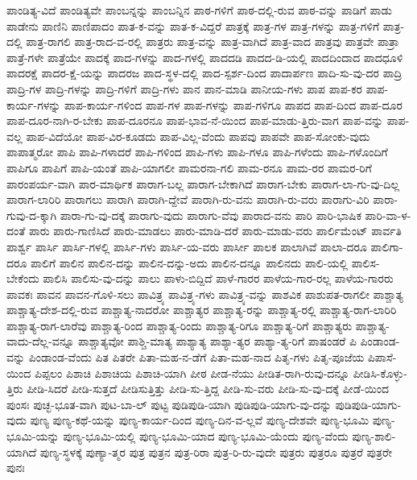 {ಪಾಂಡಿತ್ಯ-ವಿದೆ
ಪಾಂಡಿತ್ಯವೇ
ಪಾಂಬನ್ನನ್ನು
ಪಾಂಬನ್ನಿನ
ಪಾಠ-ಗಳಿಗೆ
ಪಾಠ-ದಲ್ಲಿ-ರುವ
ಪಾಠ-ವನ್ನು
ಪಾಡಿಗೆ
ಪಾಡು
ಪಾಡೇನು
ಪಾಣಿನಿ
ಪಾಣಿಪಾದಂ
ಪಾತ-ಕ-ವನ್ನು
ಪಾತ-ಕ-ವಿದ್ದರೆ
ಪಾತ್ರಕ್ಕೆ
ಪಾತ್ರ-ಗಳ
ಪಾತ್ರ-ಗಳನ್ನು
ಪಾತ್ರ-ಗಳಿಗೆ
ಪಾತ್ರ-ದಲ್ಲಿ
ಪಾತ್ರ-ರಾಗಲಿ
ಪಾತ್ರ-ರಾದ-ವ-ರಲ್ಲಿ
ಪಾತ್ರರು
ಪಾತ್ರ-ವನ್ನು
ಪಾತ್ರ-ವಾಗಿದೆ
ಪಾತ್ರ-ವಾದ
ಪಾತ್ರವು
ಪಾತ್ರವೇ
ಪಾತ್ರಾ
ಪಾತ್ರೆ-ಗಳೇ
ಪಾತ್ರೆಯೇ
ಪಾದಕ್ಕೆ
ಪಾದ-ಗಳನ್ನು
ಪಾದ-ಗಳಲ್ಲಿ
ಪಾದದಡಿ
ಪಾದದ-ಡಿ-ಯಲ್ಲಿ
ಪಾದದಿಂದಾದ
ಪಾದಧೂಳಿ
ಪಾದರಕ್ಷೆ
ಪಾದರ-ಕ್ಷೆ-ಯನ್ನು
ಪಾದರಜ
ಪಾದ-ಸ್ಥಳ-ದಲ್ಲಿ
ಪಾದ-ಸ್ಪರ್ಶ-ದಿಂದ
ಪಾದಾರ್ಪಣ
ಪಾದಿ-ಸು-ವು-ದರ
ಪಾದ್ರಿ
ಪಾದ್ರಿ-ಗಳ
ಪಾದ್ರಿ-ಗಳನ್ನು
ಪಾದ್ರಿ-ಗಳಿಗೆ
ಪಾದ್ರಿ-ಗಳು
ಪಾನ
ಪಾನ-ಮಾಡಿ
ಪಾನೀಯ-ಗಳು
ಪಾಪ
ಪಾಪ-ಕರ
ಪಾಪ-ಕಾರ್ಯ-ಗಳನ್ನು
ಪಾಪ-ಕಾರ್ಯ-ಗಳಿಂದ
ಪಾಪ-ಗಳ
ಪಾಪ-ಗಳನ್ನು
ಪಾಪ-ಗಳಿಗೂ
ಪಾಪದ
ಪಾಪ-ದಿಂದ
ಪಾಪ-ದೂರ
ಪಾಪ-ದೂರ-ನಾಗಿ-ರ-ಬೇಕು
ಪಾಪ-ದೂರನೂ
ಪಾಪ-ಭಾವ-ನೆ-ಯಿಂದ
ಪಾಪ-ಮಾಡು-ತ್ತಿರು-ವಾಗ
ಪಾಪ-ವನ್ನು
ಪಾಪ-ವಲ್ಲ
ಪಾಪ-ವಿದೆಯೋ
ಪಾಪ-ವಿರ-ಕೂಡದು
ಪಾಪ-ವಿಲ್ಲ-ವೆಂದು
ಪಾಪವು
ಪಾಪವೇ
ಪಾಪ-ಸೋಂಕು-ವುದು
ಪಾಪಾತ್ಮರೋ
ಪಾಪಿ
ಪಾಪಿ-ಗಳಾದರೆ
ಪಾಪಿ-ಗಳಿಂದ
ಪಾಪಿ-ಗಳು
ಪಾಪಿ-ಗಳೂ
ಪಾಪಿ-ಗಳೆಂದು
ಪಾಪಿ-ಗಳೊಂದಿಗೆ
ಪಾಪಿಗೂ
ಪಾಪಿಗೆ
ಪಾಪಿ-ಯಂತೆ
ಪಾಪಿ-ಯಾಗಲೀ
ಪಾಮರನಾ-ಗಲಿ
ಪಾಮ-ರನೂ
ಪಾಮ-ರರ
ಪಾಮರ-ರಿಗೆ
ಪಾರಂಪರ್ಯ-ವಾಗಿ
ಪಾರ-ಮಾರ್ಥಿಕ
ಪಾರಾಗ-ಬಲ್ಲ
ಪಾರಾಗ-ಬೇಕಾಗಿದೆ
ಪಾರಾಗ-ಬೇಕು
ಪಾರಾಗ-ಲಾ-ಗು-ವು-ದಿಲ್ಲ
ಪಾರಾಗ-ಲಾರಿರಿ
ಪಾರಾಗಲು
ಪಾರಾಗಿ
ಪಾರಾಗಿ-ದ್ದೇವೆ
ಪಾರಾಗಿ-ರು-ವನು
ಪಾರಾಗಿ-ರು-ವರು
ಪಾರಾಗು-ವಿರಿ
ಪಾರಾ-ಗುವು-ದ-ಕ್ಕಾಗಿ
ಪಾರಾ-ಗು-ವು-ದಕ್ಕೆ
ಪಾರಾಗು-ವುದು
ಪಾರಾಗು-ವೆವು
ಪಾರಾದ-ವನು
ಪಾರಿ
ಪಾರಿ-ಭಾಷಿಕ
ಪಾರಿ-ವಾ-ಳ-ದಂತೆ
ಪಾರು
ಪಾರು-ಗಾಣಿಸಿದೆ
ಪಾರು-ಮಾಡಲು
ಪಾರು-ಮಾಡಿ-ದರೆ
ಪಾರು-ಮಾಡು-ವರು
ಪಾರ್ಲಿಮೆಂಟ್
ಪಾರ್ವತಿ
ಪಾರ್ಶ್ವ
ಪಾರ್ಸಿ
ಪಾರ್ಸಿ-ಗಳಲ್ಲಿ
ಪಾರ್ಸಿ-ಗಳು
ಪಾರ್ಸಿ-ಯ-ವರು
ಪಾರ್ಸೀ
ಪಾಲಕ
ಪಾಲಾಗಿವೆ
ಪಾಲಾ-ದರೂ
ಪಾಲಿಗಾ-ದರೂ
ಪಾಲಿಗೆ
ಪಾಲಿನ
ಪಾಲಿನ-ದನ್ನು
ಪಾಲಿನ-ದನ್ನು-ಅದು
ಪಾಲಿನ-ದನ್ನೂ
ಪಾಲಿನದು
ಪಾಲಿ-ಯಲ್ಲಿ
ಪಾಲಿಸ-ಬೇಕೆಂದು
ಪಾಲಿಸಿ
ಪಾಲಿಸು-ವು-ದನ್ನು
ಪಾಲು
ಪಾಳು-ಬಿದ್ದಿದೆ
ಪಾಳೆ-ಗಾರರ
ಪಾಳೆಯ-ಗಾರ-ರಲ್ಲ
ಪಾಳೆಯ-ಗಾರರು
ಪಾವಕಃ
ಪಾವನ
ಪಾವನ-ಗೊಳಿ-ಸಲು
ಪಾವಿತ್ರ್ಯ
ಪಾವಿತ್ರ್ಯ-ಗಳು
ಪಾವಿತ್ರ್ಯ-ವನ್ನು
ಪಾಶವಿಕ
ಪಾಶುಪತ-ರಾಗಲೀ
ಪಾಶ್ಚಾತ್ಯ
ಪಾಶ್ಚಾತ್ಯ-ದೇಶ-ದಲ್ಲಿ-ರುವ
ಪಾಶ್ಚಾತ್ಯ-ನಾದರೋ
ಪಾಶ್ಚಾತ್ಯರ
ಪಾಶ್ಚಾತ್ಯ-ರನ್ನು
ಪಾಶ್ಚಾತ್ಯ-ರಲ್ಲಿ
ಪಾಶ್ಚಾತ್ಯ-ರಾಗ-ಲಾರಿರಿ
ಪಾಶ್ಚಾತ್ಯ-ರಾಗ-ಲಾರೆವು
ಪಾಶ್ಚಾತ್ಯ-ರಿಂದ
ಪಾಶ್ಚಾತ್ಯ-ರಿಂದು
ಪಾಶ್ಚಾತ್ಯ-ರಿಗೂ
ಪಾಶ್ಚಾತ್ಯ-ರಿಗೆ
ಪಾಶ್ಚಾತ್ಯರು
ಪಾಶ್ಚಾತ್ಯ-ವಾದು-ದೆಲ್ಲ-ವನ್ನೂ
ಪಾಶ್ಚಾತ್ಯವೋ
ಪಾಶ್ಚಿ-ಮಾತ್ಯ
ಪಾಶ್ಯಾತ್ಯ
ಪಾಶ್ಯಾ-ತ್ಯರ
ಪಾಶ್ಯಾ-ತ್ಯ-ರಿಗೆ
ಪಾಷಂಡರೆ
ಪಿ
ಪಿಂಡಾಂಡ-ವನ್ನು
ಪಿಂಡಾಂಡ-ವೆಂದು
ಪಿತ
ಪಿತರೇ
ಪಿತಾ-ಮಹ-ನ-ಡೆಗೆ
ಪಿತಾ-ಮಹ-ನಾದ
ಪಿತೃ-ಗಳು
ಪಿತೃ-ಪೂಜೆಯ
ಪಿಪಾಸೆ-ಯಿಂದ
ಪಿಪ್ಪಲಂ
ಪಿಶಾಚಿ
ಪಿಶಾಚಿಯ
ಪಿಶಾಚಿ-ಯಾಗಿ
ಪೀಠ
ಪೀಡ-ನೆಯು
ಪೀಡಿತ-ರಾಗಿ-ರುವು-ದನ್ನೂ
ಪೀಡಿಸಿ-ಕೊಳ್ಳು-ತ್ತಿರು
ಪೀಡಿ-ಸಿದರೆ
ಪೀಡಿ-ಸುತ್ತದೆ
ಪೀಡಿಸುತ್ತಿತ್ತು
ಪೀಡಿ-ಸು-ತ್ತಿದ್ದ
ಪೀಡಿ-ಸು-ವರು
ಪೀಡಿ-ಸು-ವು-ದಕ್ಕೆ
ಪೀಡೆ-ಯಿಂದ
ಪುಂಸಃ
ಪುಚ್ಛ-ಭೂತ-ವಾಗಿ
ಪುಟ-ಬಾ-ಲ್
ಪುಟ್ಟ
ಪುಡಿಪುಡಿ-ಯಾಗಿ
ಪುಡಿಪುಡಿ-ಯಾಗು-ವು-ದನ್ನು
ಪುಡಿಪುಡಿ-ಯಾಗು-ವುದು
ಪುಣ್ಯ
ಪುಣ್ಯ-ಕಥೆ-ಯನ್ನು
ಪುಣ್ಯ-ಕಾರ್ಯ-ದಿಂದ
ಪುಣ್ಯ-ದಿನ-ವ-ಲ್ಲವೆ
ಪುಣ್ಯ-ದೇಶವೇ
ಪುಣ್ಯ-ಭೂಮಿ
ಪುಣ್ಯ-ಭೂಮಿ-ಯನ್ನು
ಪುಣ್ಯ-ಭೂಮಿ-ಯಲ್ಲಿ
ಪುಣ್ಯ-ಭೂಮಿ-ಯಾದ
ಪುಣ್ಯ-ಭೂಮಿ-ಯೆಂದು
ಪುಣ್ಯ-ವೆಂದು
ಪುಣ್ಯ-ಶಾಲಿ-ಯಾಗಿದೆ
ಪುಣ್ಯ-ಸ್ಥಳಕ್ಕೆ
ಪುಣ್ಯಾ-ತ್ಮರ
ಪುತ್ರ
ಪುತ್ರನ
ಪುತ್ರ-ರಿರಾ
ಪುತ್ರ-ರಿ-ರು-ವುದೇ
ಪುತ್ರರು
ಪುತ್ರರೂ
ಪುತ್ರರೆ
ಪುತ್ರರೇ
ಪುನಃ
}
